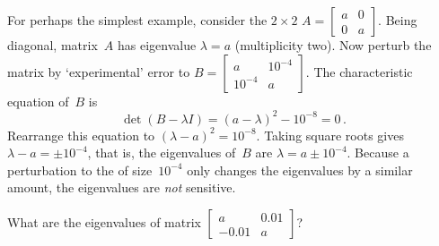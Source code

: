 \begin{example} \label{eg:}
For perhaps the simplest example, consider the \(2\times2\)  \(A=\begin{bmatrix} a&0\\0&a \end{bmatrix}\).
Being diagonal, matrix~\(A\) has eigenvalue \(\lambda=a\) (multiplicity two).
Now perturb the matrix by `experimental' error to \(B=\begin{bmatrix} a&10^{-4}\\ 10^{-4}&a \end{bmatrix}\).
The characteristic equation of~\(B\) is
\begin{equation*}
\det(B-\lambda I)=(a-\lambda)^2-10^{-8}=0\,.
\end{equation*}
Rearrange this equation to \((\lambda-a)^2=10^{-8}\).  
Taking square roots gives \(\lambda-a=\pm 10^{-4}\), that is, the eigenvalues of~\(B\) are \(\lambda=a\pm10^{-4}\).
Because a perturbation to the  of size~\(10^{-4}\) only changes the eigenvalues by a similar amount, the eigenvalues are \emph{not} sensitive.
\end{example}





\begin{activity}
What are the eigenvalues of matrix \(\begin{bmatrix} a&0.01\\-0.01&a \end{bmatrix}\)?
\end{activity}





